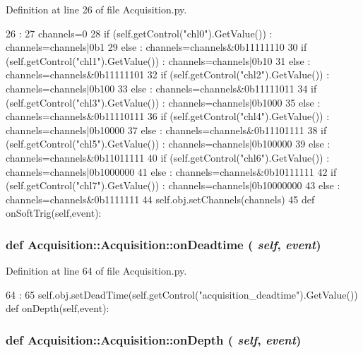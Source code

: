 Definition at line 26 of file Acquisition.py.


\begin{DoxyCode}
26                            :
27         channels=0
28         if (self.getControl("chl0").GetValue()) : channels=channels|0b1
29         else : channels=channels&0b11111110
30         if (self.getControl("chl1").GetValue()) : channels=channels|0b10
31         else : channels=channels&0b11111101
32         if (self.getControl("chl2").GetValue()) : channels=channels|0b100
33         else : channels=channels&0b11111011
34         if (self.getControl("chl3").GetValue()) : channels=channels|0b1000
35         else : channels=channels&0b11110111
36         if (self.getControl("chl4").GetValue()) : channels=channels|0b10000
37         else : channels=channels&0b11101111
38         if (self.getControl("chl5").GetValue()) : channels=channels|0b100000
39         else : channels=channels&0b11011111
40         if (self.getControl("chl6").GetValue()) : channels=channels|0b1000000
41         else : channels=channels&0b10111111
42         if (self.getControl("chl7").GetValue()) : channels=channels|0b10000000
43         else : channels=channels&0b1111111
44         self.obj.setChannels(channels)            
45         
    def onSoftTrig(self,event):
\end{DoxyCode}
\hypertarget{classAcquisition_1_1Acquisition_a8dcc93fe78f971ad8a39547edac81bf0}{
\subsubsection[{onDeadtime}]{\setlength{\rightskip}{0pt plus 5cm}def Acquisition::Acquisition::onDeadtime ( {\em self}, \/   {\em event})}}
\label{classAcquisition_1_1Acquisition_a8dcc93fe78f971ad8a39547edac81bf0}


Definition at line 64 of file Acquisition.py.


\begin{DoxyCode}
64                               :
65         self.obj.setDeadTime(self.getControl("acquisition_deadtime").GetValue())
    def onDepth(self,event):
\end{DoxyCode}
\hypertarget{classAcquisition_1_1Acquisition_a238e848f9561abc3000bc762ed291db4}{
\subsubsection[{onDepth}]{\setlength{\rightskip}{0pt plus 5cm}def Acquisition::Acquisition::onDepth ( {\em self}, \/   {\em event})}}
\label{classAcquisition_1_1Acquisition_a238e848f9561abc3000bc762ed291db4}


